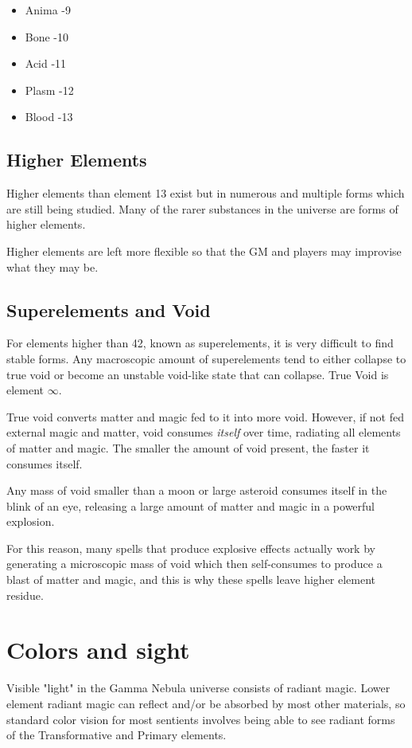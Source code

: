 \begin{itemize}
	\item Anima -9
	\item Bone -10
	\item Acid -11
	\item Plasm -12
	\item Blood -13
\end{itemize}

\subsection{Higher Elements}

Higher elements than element 13 exist but in numerous and multiple forms which are still being studied. Many of the rarer substances in the universe are forms of higher elements.

Higher elements are left more flexible so that the GM and players may improvise what they may be.

\subsection{Superelements and Void}

For elements higher than 42, known as superelements, it is very difficult to find stable forms. Any macroscopic amount of superelements tend to either collapse to true void or become an unstable void-like state that can collapse. True Void is element $\infty$.

True void converts matter and magic fed to it into more void. However, if not fed external magic and matter, void consumes \emph{itself} over time, radiating all elements of matter and magic. The smaller the amount of void present, the faster it consumes itself.

Any mass of void smaller than a moon or large asteroid consumes itself in the blink of an eye, releasing a large amount of matter and magic in a powerful explosion.

For this reason, many spells that produce explosive effects actually work by generating a microscopic mass of void which then self-consumes to produce a blast of matter and magic, and this is why these spells leave higher element residue.

\section{Colors and sight}

Visible "light" in the Gamma Nebula universe consists of radiant magic. Lower element radiant magic can reflect and/or be absorbed by most other materials, so standard color vision for most sentients involves being able to see radiant forms of the Transformative and Primary elements.

